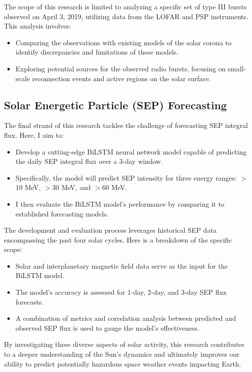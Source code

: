 The scope of this research is limited to analyzing a specific set of type III bursts observed on April 3, 2019, utilizing data from the LOFAR and PSP instruments. This analysis involves:

\begin{itemize}
	\item Comparing the observations with existing models of the solar corona to identify discrepancies and limitations of these models.
	\item Exploring potential sources for the observed radio bursts, focusing on small-scale reconnection events and active regions on the solar surface.
\end{itemize}

\subsection*{Solar Energetic Particle (SEP) Forecasting}
The final strand of this research tackles the challenge of forecasting SEP integral flux. Here, I aim to:

\begin{itemize}
	\item Develop a cutting-edge BiLSTM neural network model capable of predicting the daily SEP integral flux over a 3-day window.
	\item Specifically, the model will predict SEP intensity for three energy ranges: $>$10 MeV, $>$30 MeV, and $>$60 MeV.
	\item I then evaluate the BiLSTM model's performance by comparing it to established forecasting models.
\end{itemize}

The development and evaluation process leverages historical SEP data encompassing the past four solar cycles. Here is a breakdown of the specific scope:

\begin{itemize}
	\item Solar and interplanetary magnetic field data serve as the input for the BiLSTM model.
	\item The model's accuracy is assessed for 1-day, 2-day, and 3-day SEP flux forecasts.
	\item A combination of metrics and correlation analysis between predicted and observed SEP flux is used to gauge the model's effectiveness.
\end{itemize}

By investigating these diverse aspects of solar activity, this research contributes to a deeper understanding of the Sun's dynamics and ultimately improves our ability to predict potentially hazardous space weather events impacting Earth.

